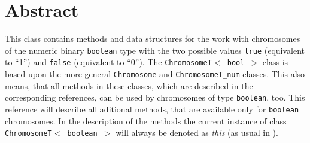 \section{Abstract}

This class contains methods and data structures for the work
with chromosomes of the numeric binary {\tt boolean} type with
the two possible values {\tt true} (equivalent to ``1'') and
{\tt false} (equivalent to ``0'').
The {\tt ChromosomeT$<$ bool $>$} class is based upon the more 
general {\tt Chromosome} and {\tt ChromosomeT\_num} classes.
This also means, that all methods in these classes, which are
described in the corresponding references, can be used by
chromosomes of type {\tt boolean}, too.
This reference will describe all aditional methods, that
are available only for {\tt boolean} chromosomes.
In the description of the methods the current instance
of class {\tt ChromosomeT$<$\nolinebreak\ boolean $>$}
will always be denoted as {\em this} (as usual in \cpp).
